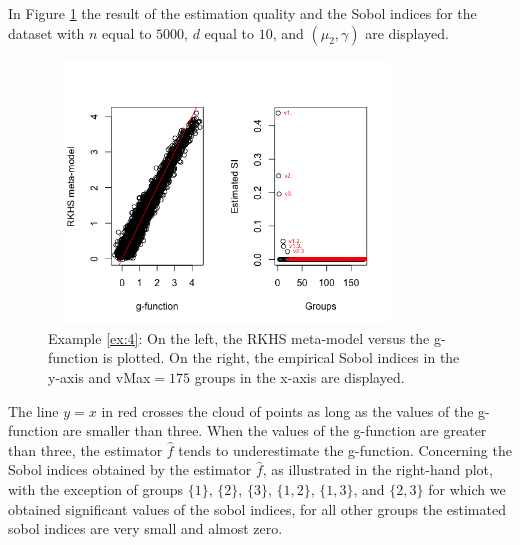In Figure \ref{SI} the result of the estimation quality and the Sobol indices for the dataset with $n$ equal to $5000$, $d$ equal to $10$, and $(\mu_2,\gamma)$ are displayed.
\begin{figure}[h!]
  \centering
  \includegraphics[height=7cm,width=9.5cm]{Rplot.png}
  \caption{Example \ref{ex:4}: On the left, the RKHS meta-model versus the g-function is plotted. On the right, the empirical Sobol indices in the y-axis and vMax$=175$ groups in the x-axis are displayed.}
  \label{SI}
\end{figure}
The line $y = x$ in red crosses the cloud of points as long as the values of the g-function are smaller than three. 
When the values of the g-function are greater than three, the estimator $\widehat{f}$ tends to underestimate the g-function. Concerning the Sobol indices obtained by the estimator $\widehat{f}$, as illustrated in the right-hand plot, with the exception of groups $\{1\}$, $\{2\}$, $\{3\}$, $\{1,2\}$, $\{1,3\}$, and $\{2,3\}$ for which we obtained significant values of the sobol indices, for all other groups the estimated sobol indices are very small and almost zero.
